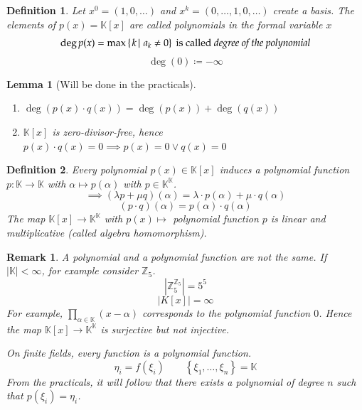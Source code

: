 \documentclass{article}
\newtheorem{definition}{Definition}  \numberwithin{definition}{section}
\newtheorem{lemma}{Lemma}  \numberwithin{lemma}{section}
\newtheorem{remark}{Remark}  \numberwithin{remark}{section}
\newcommand{\set}[1]{\left\{#1\right\}}
\newcommand{\setdef}[2]{\left\{\left.#1\,\right|\,#2\right\}}
\newcommand{\card}[1]{\left|#1\right|}
\begin{document}
\begin{definition} %
  Let $x^0 = (1, 0, \dots)$ and $x^k = (0, \dots, 1, 0, \dots)$ create a basis.
  The elements of $p(x) = \mathbb K[x]$ are called polynomials in the formal variable $x$
  \[ \deg{p(x)} = \max\setdef{k}{a_k \neq 0} \text{ is called \emph{degree of the polynomial}} \]
  \[ \deg(0) \coloneqq -\infty \]
\end{definition}

\begin{lemma}[Will be done in the practicals] %
  \begin{enumerate}
    \item $\deg(p(x) \cdot q(x)) = \deg(p(x)) + \deg(q(x))$
    \item $\mathbb K[x]$ is zero-divisor-free,
      hence $p(x) \cdot q(x) = 0 \implies p(x) = 0 \lor q(x) = 0$
  \end{enumerate}
\end{lemma}

\begin{definition} %
  Every polynomial $p(x) \in \mathbb K[x]$ induces a polynomial function $p: \mathbb K \to \mathbb K$ with $\alpha \mapsto p(\alpha)$
  with $p \in \mathbb K^{\mathbb K}$.
  \[ \implies (\lambda p + \mu q) (\alpha) = \lambda \cdot p(\alpha) + \mu \cdot q(\alpha) \]
  \[ (p \cdot q)(\alpha) = p(\alpha) \cdot q(\alpha) \]
  The map $\mathbb K[x] \to \mathbb K^{\mathbb K}$ with $p(x) \mapsto$ polynomial function $p$
  is linear and multiplicative (called \emph{algebra homomorphism}).
\end{definition}

\begin{remark} %
  A polynomial and a polynomial function are not the same.
  If $\card{\mathbb K} < \infty$, for example consider $\mathbb Z_5$.
  \[ \card{\mathbb Z_5^{\mathbb Z_5}} = 5^5 \]
  \[ \card{K[x]} = \infty \]
  For example, $\prod_{\alpha \in \mathbb K}(x - \alpha)$ corresponds to the polynomial function $0$.
  Hence the map $\mathbb K[x] \to \mathbb K^{\mathbb K}$ is surjective but not injective.

  On finite fields, every function is a polynomial function.
  \[ \eta_i = f(\xi_i) \qquad \set{\xi_1, \dots, \xi_n} = \mathbb K \]
  From the practicals, it will follow that there exists a polynomial of degree $n$ such that $p(\xi_i) = \eta_i$.
\end{remark}
\end{document}
